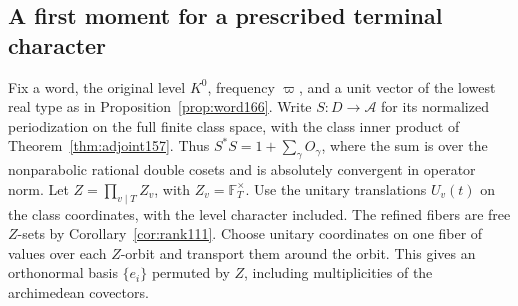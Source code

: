 \documentclass[a4paper,11pt]{article}
\theoremstyle{definition}
\theoremstyle{remark}
\numberwithin{equation}{section}
\begin{document}
\subsection{A first moment for a prescribed terminal character}\label{nav:VII-32}
Fix a word, the original level \(K^0\), frequency \(\varpi\), and
a unit vector of the lowest real type as in
Proposition~\ref{prop:word166}. Write \(S:D\to\mathcal A\) for
its normalized periodization on the full finite class space, with
the class inner product of Theorem~\ref{thm:adjoint157}. Thus
\(S^*S=1+\sum_\gamma O_\gamma\), where the sum is over the
nonparabolic rational double cosets and is absolutely convergent
in operator norm. Let \(Z=\prod_{v\mid T}Z_v\), with
\(Z_v=\mathbb F_T^\times\). Use the unitary translations
\(U_v(t)\) on the class coordinates, with the level character
included. The refined fibers are free \(Z\)-sets by Corollary~\ref{cor:rank111}. Choose unitary coordinates on one
fiber of values over each \(Z\)-orbit and transport them around
the orbit. This gives an orthonormal basis \(\{e_i\}\) permuted
by \(Z\), including multiplicities of the archimedean covectors.
\end{document}

